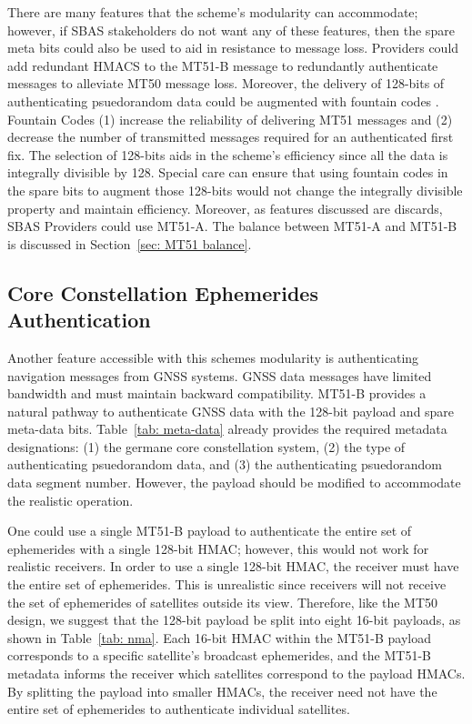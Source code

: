 \documentclass[letterpaper,times]{IONconf/IONconf}
\begin{document}
		There are many features that the scheme's modularity can accommodate; however, if SBAS stakeholders do not want any of these features, then the spare meta bits could also be used to aid in resistance to message loss.
		Providers could add redundant HMACS to the MT51-B message to redundantly authenticate messages to alleviate MT50 message loss.
		Moreover, the delivery of 128-bits of authenticating psuedorandom data could be augmented with fountain codes \cite{gnss_fountain_codes}.
		Fountain Codes (1) increase the reliability of delivering MT51 messages and (2) decrease the number of transmitted messages required for an authenticated first fix.
		The selection of 128-bits aids in the scheme's efficiency since all the data is integrally divisible by 128.
		Special care can ensure that using fountain codes in the spare bits to augment those 128-bits would not change the integrally divisible property and maintain efficiency.
		Moreover, as features discussed are discards, SBAS Providers could use MT51-A.
		The balance between MT51-A and MT51-B is discussed in Section~\ref{sec: MT51 balance}.

	\subsection{Core Constellation Ephemerides Authentication} \label{sub:core_eph}

		Another feature accessible with this schemes modularity is authenticating navigation messages from GNSS systems.
		GNSS data messages have limited bandwidth and must maintain backward compatibility.
		MT51-B provides a natural pathway to authenticate GNSS data with the 128-bit payload and spare meta-data bits.
		Table~\ref{tab: meta-data} already provides the required metadata designations: (1) the germane core constellation system, (2) the type of authenticating psuedorandom data, and (3) the authenticating psuedorandom data segment number.
		However, the payload should be modified to accommodate the realistic operation.

		One could use a single MT51-B payload to authenticate the entire set of ephemerides with a single 128-bit HMAC; however, this would not work for realistic receivers.
		In order to use a single 128-bit HMAC, the receiver must have the entire set of ephemerides.
		This is unrealistic since receivers will not receive the set of ephemerides of satellites outside its view.
		Therefore, like the MT50 design, we suggest that the 128-bit payload be split into eight 16-bit payloads, as shown in Table~\ref{tab: nma}.
		Each 16-bit HMAC within the MT51-B payload corresponds to a specific satellite's broadcast ephemerides, and the MT51-B metadata informs the receiver which satellites correspond to the payload HMACs.
		By splitting the payload into smaller HMACs, the receiver need not have the entire set of ephemerides to authenticate individual satellites.
\end{document}
